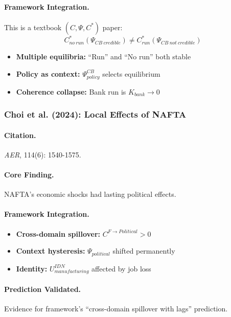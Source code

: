 \documentclass[12pt,a4paper]{article}
\begin{document}
\paragraph{Framework Integration.}
This is a textbook $(C, \Psi, C^*)$ paper:
\begin{equation}
  C^*_{no\ run}(\Psi_{CB\ credible}) \neq C^*_{run}(\Psi_{CB\ not\ credible})
\end{equation}
\begin{itemize}
  \item \textbf{Multiple equilibria:} ``Run'' and ``No run'' both stable
  \item \textbf{Policy as context:} $\Psi_{policy}^{CB}$ selects equilibrium
  \item \textbf{Coherence collapse:} Bank run is $K_{bank} \to 0$
\end{itemize}

\subsubsection{Choi et al. (2024): Local Effects of NAFTA}

\paragraph{Citation.}
\emph{AER}, 114(6): 1540-1575.

\paragraph{Core Finding.}
NAFTA's economic shocks had lasting political effects.

\paragraph{Framework Integration.}
\begin{itemize}
  \item \textbf{Cross-domain spillover:} $C^{F \to Political} > 0$
  \item \textbf{Context hysteresis:} $\Psi_{political}$ shifted permanently
  \item \textbf{Identity:} $U^{IDN}_{manufacturing}$ affected by job loss
\end{itemize}

\paragraph{Prediction Validated.}
Evidence for framework's ``cross-domain spillover with lags'' prediction.
\end{document}
